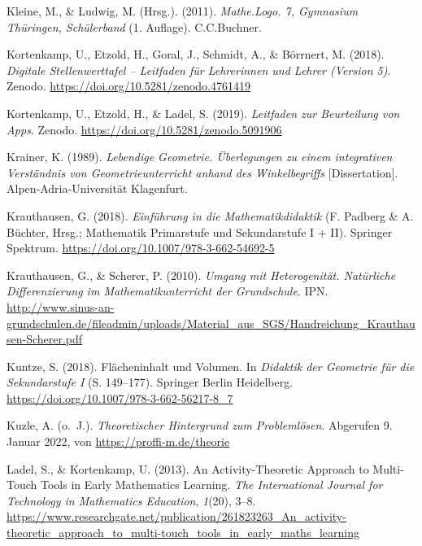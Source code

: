 \documentclass[
]{scrbook}
\newlength{\cslhangindent}
\newlength{\cslentryspacingunit} %
\newenvironment{CSLReferences}[2] %
 {%
  \setlength{\parindent}{0pt}
  \ifodd #1
  \let\oldpar\par
  \def\par{\hangindent=\cslhangindent\oldpar}
  \fi
  \setlength{\parskip}{#2\cslentryspacingunit}
 }%
 {}
\theoremstyle{definition}
\theoremstyle{definition}
\theoremstyle{definition}
\theoremstyle{definition}
\theoremstyle{remark}
\begin{document}
\begin{CSLReferences}{1}{0}
\leavevmode{}%
Kleine, M., \& Ludwig, M. (Hrsg.). (2011). \emph{Mathe.{Logo}. 7, {Gymnasium} {Thüringen}, {Schülerband}} (1. Auflage). C.C.Buchner.

\leavevmode{}%
Kortenkamp, U., Etzold, H., Goral, J., Schmidt, A., \& Börrnert, M. (2018). \emph{Digitale {Stellenwerttafel} -- {Leitfaden} für {Lehrerinnen} und {Lehrer} ({Version} 5)}. Zenodo. \url{https://doi.org/10.5281/zenodo.4761419}

\leavevmode{}%
Kortenkamp, U., Etzold, H., \& Ladel, S. (2019). \emph{Leitfaden zur {Beurteilung} von {Apps}}. Zenodo. \url{https://doi.org/10.5281/zenodo.5091906}

\leavevmode{}%
Krainer, K. (1989). \emph{Lebendige {Geometrie}. Überlegungen zu einem integrativen {Verständnis} von {Geometrieunterricht} anhand des {Winkelbegriffs}} {[}Dissertation{]}. Alpen-Adria-Universität Klagenfurt.

\leavevmode{}%
Krauthausen, G. (2018). \emph{Einführung in die {Mathematikdidaktik}} (F. Padberg \& A. Büchter, Hrsg.; Mathematik Primarstufe und Sekundarstufe I + II). Springer Spektrum. \url{https://doi.org/10.1007/978-3-662-54692-5}

\leavevmode{}%
Krauthausen, G., \& Scherer, P. (2010). \emph{Umgang mit {Heterogenität}. {Natürliche} {Differenzierung} im {Mathematikunterricht} der {Grundschule}}. IPN. \url{http://www.sinus-an-grundschulen.de/fileadmin/uploads/Material_aus_SGS/Handreichung_Krauthausen-Scherer.pdf}

\leavevmode{}%
Kuntze, S. (2018). Flächeninhalt und {Volumen}. In \emph{Didaktik der {Geometrie} für die {Sekundarstufe} {I}} (S. 149--177). Springer Berlin Heidelberg. \url{https://doi.org/10.1007/978-3-662-56217-8_7}

\leavevmode{}%
Kuzle, A. (o.~J.). \emph{Theoretischer {Hintergrund} zum {Problemlösen}}. Abgerufen 9. Januar 2022, von \url{https://proffi-m.de/theorie}

\leavevmode{}%
Ladel, S., \& Kortenkamp, U. (2013). An {Activity}-{Theoretic} {Approach} to {Multi}-{Touch} {Tools} in {Early} {Mathematics} {Learning}. \emph{The International Journal for Technology in Mathematics Education}, \emph{1}(20), 3--8. \url{https://www.researchgate.net/publication/261823263_An_activity-theoretic_approach_to_multi-touch_tools_in_early_maths_learning}


\end{CSLReferences}
\end{document}
